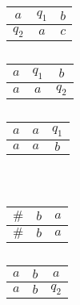 \documentclass[b5paper, 11pt]{book}
\theoremstyle{definition}
\newenvironment{pf*}{\pushQED{\qed}\pf}
{\popQED\endpf}
\begin{document}
\begin{pf*}
\begin{table}[!ht]
\begin{subtable}[h]{0.3\textwidth}
\begin{tabular}{ | c | c | c|}
            $a$ & $q_1$ & $b$ \\ 
            \hline 
            $q_2$ & $a$ & $c$ \\ 
            \hline
           \end{tabular}
           \caption{}
        \end{subtable}
        \hfill
        \begin{subtable}[h]{0.3\textwidth}
            \centering
            \begin{tabular}{ | c | c | c|}
            \hline 
            $a$ & $q_1$ & $b$ \\ 
            \hline 
            $a$ & $a$ & $q_2$ \\ 
            \hline
           \end{tabular}
           \caption{}
        \end{subtable}
        \hfill
        \begin{subtable}[h]{0.3\textwidth}
            \centering
            \begin{tabular}{ | c | c | c|}
            \hline 
            $a$ & $a$ & $q_1$ \\ 
            \hline 
            $a$ & $a$ & $b$ \\ 
            \hline
           \end{tabular}
           \caption{}
        \end{subtable}\\
        \begin{subtable}[h]{0.3\textwidth}
            \centering
            \begin{tabular}{ | c | c | c|}
            \hline 
            $\#$ & $b$ & $a$ \\ 
            \hline 
            $\#$ & $b$ & $a$ \\ 
            \hline
           \end{tabular}
           \caption{}
        \end{subtable}
        \hfill
        \begin{subtable}[h]{0.3\textwidth}
            \centering
            \begin{tabular}{ | c | c | c|}
            \hline 
            $a$ & $b$ & $a$ \\ 
            \hline 
            $a$ & $b$ & $q_2$ \\ 
            \hline
           \end{tabular}
           \caption{}
        \end{subtable}

\end{table}
\end{pf*}
\end{document}
